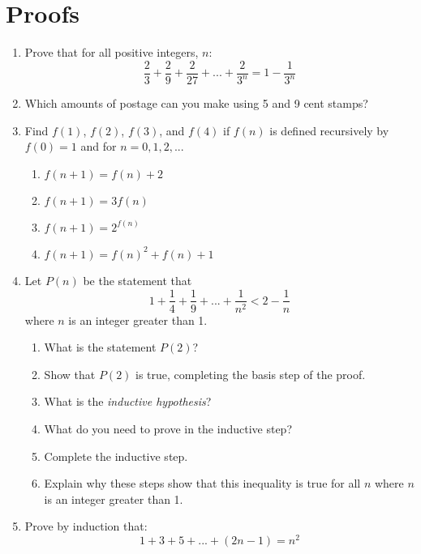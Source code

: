 \documentclass{article}
\begin{document}
\section{Proofs}
\begin{enumerate}
\item Prove that for all positive integers, $n$:
\[ \frac{2}{3} + \frac{2}{9} + \frac{2}{27} + ... + \frac{2}{3^n} = 1 - \frac{1}{3^n} \]
\item Which amounts of postage can you make using 5 and 9 cent stamps?
\item Find $f(1)$, $f(2)$, $f(3)$, and $f(4)$ if $f(n)$ is defined recursively by $f(0) = 1$ and for $n = 0, 1, 2, ...$
  \begin{enumerate}
  \item $f(n + 1) = f(n) + 2$
  \item $f(n + 1) = 3f(n)$
  \item $f(n + 1) = 2^{f(n)}$
  \item $f(n + 1) = f(n)^2 + f(n) + 1$
  \end{enumerate}
\item Let $P(n)$ be the statement that
\[ 1 + \frac{1}{4} + \frac{1}{9} + ... + \frac{1}{n^2} < 2 - \frac{1}{n} \]
where $n$ is an integer greater than 1.
  \begin{enumerate}
  \item What is the statement $P(2)$?
  \item Show that $P(2)$ is true, completing the basis step of the proof.
  \item What is the \textit{inductive hypothesis}?
  \item What do you need to prove in the inductive step?
  \item Complete the inductive step.
  \item Explain why these steps show that this inequality is true for all $n$ where $n$ is an integer greater than 1.
  \end{enumerate}
\item Prove by induction that:
\[ 1 + 3 + 5 + ... + (2n - 1) = n^2 \]
\end{enumerate}
\end{document}
